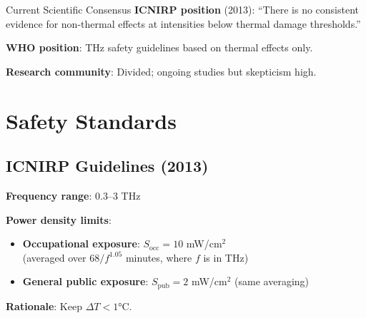 \begin{calloutbox}{Current Scientific Consensus}
\textbf{ICNIRP position} (2013): ``There is no consistent evidence for non-thermal effects at intensities below thermal damage thresholds.''

\textbf{WHO position}: THz safety guidelines based on thermal effects only.

\textbf{Research community}: Divided; ongoing studies but skepticism high.
\end{calloutbox}

\section{Safety Standards}

\subsection{ICNIRP Guidelines (2013)}

\textbf{Frequency range}: 0.3--3 THz

\textbf{Power density limits}:
\begin{itemize}
\item \textbf{Occupational exposure}: $S_{\text{occ}} = 10$ mW/cm$^2$\\
(averaged over $68/f^{1.05}$ minutes, where $f$ is in THz)
\item \textbf{General public exposure}: $S_{\text{pub}} = 2$ mW/cm$^2$ (same averaging)
\end{itemize}

\textbf{Rationale}: Keep $\Delta T < 1°$C.

